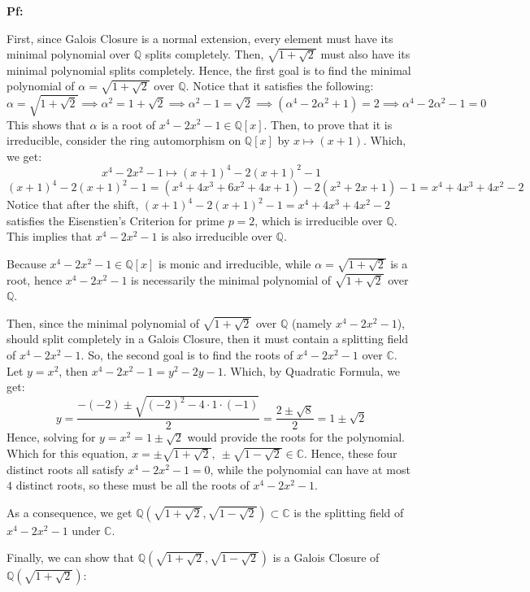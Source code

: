 \documentclass{article}
\begin{document}
\textbf{Pf:}

First, since Galois Closure is a normal extension, every element must have its minimal polynomial over $\mathbb{Q}$ splits completely. Then, $\sqrt{1+\sqrt{2}}$ must also have its minimal polynomial splits completely. Hence, the first goal is to find the minimal polynomial of $\alpha=\sqrt{1+\sqrt{2}}$ over $\mathbb{Q}$. Notice that it satisfies the following:
$$\alpha=\sqrt{1+\sqrt{2}}\implies \alpha^2=1+\sqrt{2} \implies \alpha^2-1 = \sqrt{2} \implies (\alpha^4-2\alpha^2+1)=2\implies \alpha^4-2\alpha^2-1 = 0$$
This shows that $\alpha$ is a root of $x^4-2x^2-1 \in\mathbb{Q}[x]$. Then, to prove that it is irreducible, consider the ring automorphism on $\mathbb{Q}[x]$ by $x\mapsto (x+1)$. Which, we get:
$$x^4-2x^2-1\mapsto (x+1)^4-2(x+1)^2-1$$
$$(x+1)^4-2(x+1)^2-1 = (x^4+4x^3+6x^2+4x+1)-2(x^2+2x+1)-1 = x^4+4x^3 + 4x^2 - 2$$
Notice that after the shift, $(x+1)^4-2(x+1)^2-1 = x^4+4x^3+4x^2-2$ satisfies the Eisenstien's Criterion for prime $p=2$, which is irreducible over $\mathbb{Q}$. This implies that $x^4-2x^2-1$ is also irreducible over $\mathbb{Q}$.

Because $x^4-2x^2-1\in\mathbb{Q}[x]$ is monic and irreducible, while $\alpha=\sqrt{1+\sqrt{2}}$ is a root, hence $x^4-2x^2-1$ is necessarily the minimal polynomial of $\sqrt{1+\sqrt{2}}$ over $\mathbb{Q}$.

\hfil

Then, since the minimal polynomial of $\sqrt{1+\sqrt{2}}$ over $\mathbb{Q}$ (namely $x^4-2x^2-1$), should split completely in a Galois Closure, then it must contain a splitting field of $x^4-2x^2-1$. So, the second goal is to find the roots of $x^4-2x^2-1$ over $\mathbb{C}$. Let $y=x^2$, then $x^4-2x^2-1 = y^2-2y-1$. Which, by Quadratic Formula, we get:
$$y = \frac{-(-2)\pm\sqrt{(-2)^2-4\cdot 1\cdot (-1)}}{2} = \frac{2\pm\sqrt{8}}{2} = 1\pm\sqrt{2}$$
Hence, solving for $y=x^2=1\pm\sqrt{2}$ would provide the roots for the polynomial. Which for this equation, $x = \pm\sqrt{1+\sqrt{2}},\ \pm\sqrt{1-\sqrt{2}}\in\mathbb{C}$. Hence, these four distinct roots all satisfy $x^4-2x^2-1=0$, while the polynomial can have at most $4$ distinct roots, so these must be all the roots of $x^4-2x^2-1$.

As a consequence, we get $\mathbb{Q}(\sqrt{1+\sqrt{2}},\sqrt{1-\sqrt{2}})\subset \mathbb{C}$ is the splitting field of $x^4-2x^2-1$ under $\mathbb{C}$.

\hfil

Finally, we can show that $\mathbb{Q}(\sqrt{1+\sqrt{2}},\sqrt{1-\sqrt{2}})$ is a Galois Closure of $\mathbb{Q}(\sqrt{1+\sqrt{2}})$:
\end{document}
